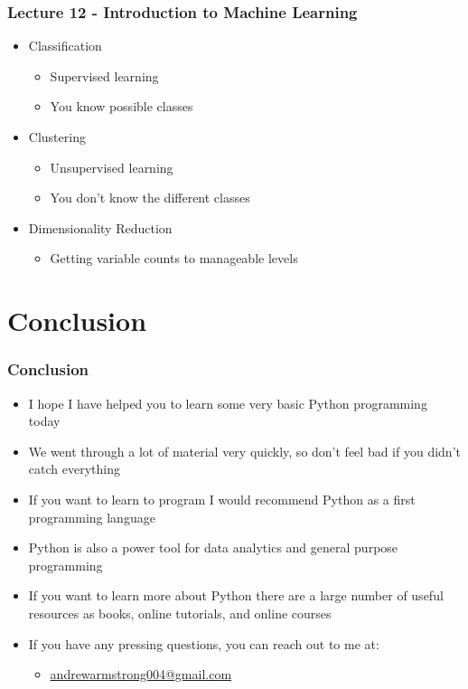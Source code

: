 \documentclass[mini frame in current subsection]{beamer}
\begin{document}
		\begin{frame}
			\frametitle{Lecture 12 - Introduction to Machine Learning}
			\begin{itemize}
				\vfill\item  Classification
					\begin{itemize}
						\item  Supervised learning
						\item  You know possible classes
					\end{itemize}
				\vfill\item  Clustering
					\begin{itemize}
						\item  Unsupervised learning
						\item  You don't know the different classes
					\end{itemize}
				\vfill\item  Dimensionality Reduction
					\begin{itemize}
						\item  Getting variable counts to manageable levels
					\end{itemize}
			\end{itemize}
		\end{frame}
		
\section{Conclusion}

	\begin{frame}
		\frametitle{Conclusion}
		\begin{itemize}
			\item  I hope I have helped you to learn some very basic Python programming today
			\item  We went through a lot of material very quickly, so don't feel bad if you didn't catch everything
			\item  If you want to learn to program I would recommend Python as a first programming language
			\item  Python is also a power tool for data analytics and general purpose programming
			\item  If you want to learn more about Python there are a large number of useful resources as books, online tutorials, and online courses
			\item  If you have any pressing questions, you can reach out to me at:
				\begin{itemize}
					\item  \href{mailto:andrewarmstrong004@gmail.com}{andrewarmstrong004@gmail.com}
				\end{itemize}
		\end{itemize}
	\end{frame}
		
\end{document}
